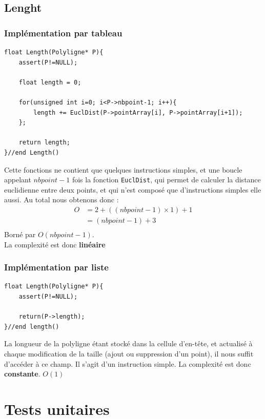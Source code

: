 \documentclass[a4paper, 11pt, oneside]{article}
\begin{document}
\subsection{Lenght}
\subsubsection{Implémentation par tableau}
\begin{lstlisting}
float Length(Polyligne* P){
    assert(P!=NULL);

    float length = 0;

    for(unsigned int i=0; i<P->nbpoint-1; i++){
        length += EuclDist(P->pointArray[i], P->pointArray[i+1]);
    };

    return length;
}//end Length()
\end{lstlisting}
Cette fonctions ne contient que quelques instructions simples, et une boucle appelant $nbpoint-1$ fois la fonction \texttt{EuclDist}, qui permet de calculer la distance euclidienne entre deux points, et qui n'est composé que d'instructions simples elle aussi. 
Au total nous obtenons donc :
\begin{align}
  O &= 2 + ((nbpoint-1) \times 1) + 1 \nonumber \\
       &= (nbpoint-1) + 3 \nonumber \\
\end{align}
Borné par $O(nbpoint-1)$.
\\La complexité est donc \textbf{linéaire}

\subsubsection{Implémentation par liste}
\begin{lstlisting}
float Length(Polyligne* P){
    assert(P!=NULL);
    
    return(P->length);
}//end length()
\end{lstlisting}
La longueur de la polyligne étant stocké dans la cellule d'en-tête, et actualisé à chaque modification de la taille (ajout ou suppression d'un point), il nous suffit d'accéder à ce champ. 
Il s'agit d'un instruction simple. La complexité est donc \textbf{constante}. $O(1)$

\section{Tests unitaires}
\end{document}
